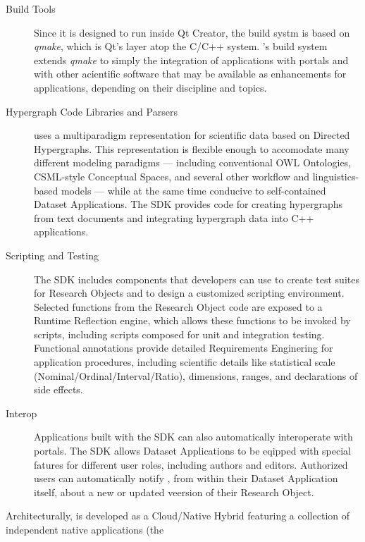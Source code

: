 \documentclass[11pt,letterpaper]{article}
\begin{document}
\begin{description}
\item[Build Tools]  Since it is designed to run 
inside Qt Creator, the {\RAK} build systm 
is based on \textit{qmake}, which is Qt's 
layer atop the C/C++  system.  
{\MOSAIC}'s build system extends \textit{qmake} to 
simply the integration of {\RAK} applications 
with {\MOSAIC} portals and with other acientific 
software that may be available as enhancements 
for {\RAK} applications, depending on their 
discipline and topics.

\item[Hypergraph Code Libraries and Parsers]  
{\MOSAIC} uses a multiparadigm representation for 
scientific data based on Directed Hypergraphs.  
This representation is flexible enough to 
accomodate many different modeling 
paradigms --- including 
conventional OWL Ontologies, 
CSML-style Conceptual Spaces, and 
several other workflow and linguistics-based models 
--- while at the same time conducive to self-contained 
Dataset Applications.  The {\MOSAIC} SDK provides 
code for creating hypergraphs from text documents and 
integrating hypergraph data into C++ applications.

\item[Scripting and Testing]  The {\MOSAIC} SDK includes 
components that developers can use to create 
test suites for Research Objects and to design a 
customized scripting environment.  Selected 
functions from the Research Object code are exposed 
to a Runtime Reflection engine, which allows these 
functions to be invoked by scripts, including 
scripts composed for unit and integration testing.  
Functional annotations provide detailed Requirements 
Enginering for application procedures, including scientific 
details like statistical scale (Nominal/Ordinal/Interval/Ratio),
dimensions, ranges, and declarations of side effects.

\item[{\MOSAIC} Interop]  Applications built 
with the {\MOSAIC} SDK can also automatically 
interoperate with {\MOSAIC} portals.  The SDK 
allows Dataset Applications to be eqipped 
with special fatures for different user roles, 
including authors and editors.  Authorized 
users can automatically notify {\MOSAIC}, 
from within their Dataset Application itself, about 
a new or updated veersion of their Research Object.
\end{description}
\p{}
Architecturally, {\MOSAIC} is developed as a 
Cloud/Native Hybrid featuring a collection of 
independent native applications (the {\RAK} 
\end{document}

